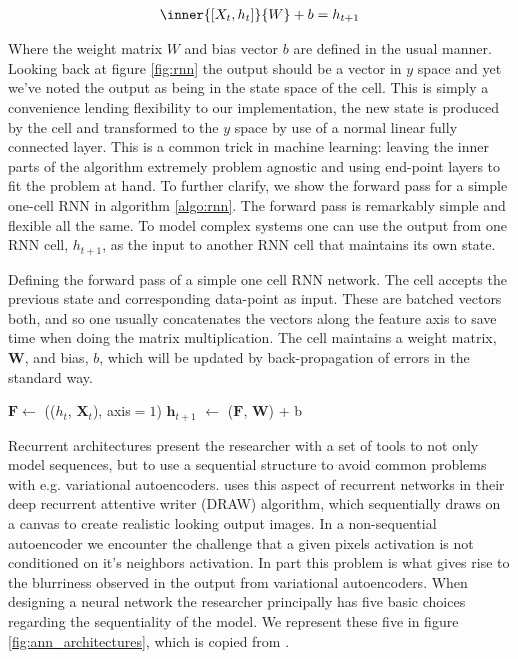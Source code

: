 \begin{align}\label{eq:rnn}
\inner{[X_t, h_t]}{W} + b = h_{t+1}
\end{align}

\noindent Where the weight matrix $W$ and bias vector $b$ are defined in the usual manner. Looking back at figure \ref{fig:rnn} the output should be a vector in $y$ space and yet we've noted the output as being in the state space of the cell. This is simply a convenience lending flexibility to our implementation, the new state is produced by the cell and transformed to the $y$ space by use of a normal linear fully connected layer. This is a common trick in machine learning: leaving the inner parts of the algorithm extremely problem agnostic and using end-point layers to fit the problem at hand. To further clarify, we show the forward pass for a simple one-cell RNN in algorithm \ref{algo:rnn}. The forward pass is remarkably simple and flexible all the same. To model complex systems one can use the output from one RNN cell, $h_{t+1}$, as the input to another RNN cell that maintains its own state. 

\begin{algorithm}[H]
\SetAlgoLined
\caption{Defining the forward pass of a simple one cell RNN network. The cell accepts the previous state and corresponding data-point as input. These are batched vectors both, and so one usually concatenates the vectors along the feature axis to save time when doing the matrix multiplication. The cell maintains a weight matrix, $\mathbf{W}$, and bias, $b$, which will be updated by back-propagation of errors in the standard way.}\label{algo:rnn}
$\mathbf{F} \gets$ (($h_t$, $\mathbf{X}_t$), axis$=1$)\;
$\mathbf{h}_{t+1}$ $\gets$ ($\mathbf{F}$, $\mathbf{W}$) + b\;
\end{algorithm}

\noindent Recurrent architectures present the researcher with a set of tools to not only model sequences, but to use a sequential structure to avoid common problems with e.g. variational autoencoders. \citet{Gregor2015} uses this aspect of recurrent networks in their deep recurrent attentive writer (DRAW) algorithm, which sequentially draws on a canvas to create realistic looking output images. In a non-sequential autoencoder we encounter the challenge that a given pixels activation is not conditioned on it's neighbors activation. In part this problem is what gives rise to the blurriness observed in the output from variational autoencoders. When designing a neural network the researcher principally has five basic choices regarding the sequentiality of the model. We represent these five in figure \ref{fig:ann_architectures}, which is copied from \citet{Karpathy2015}.

